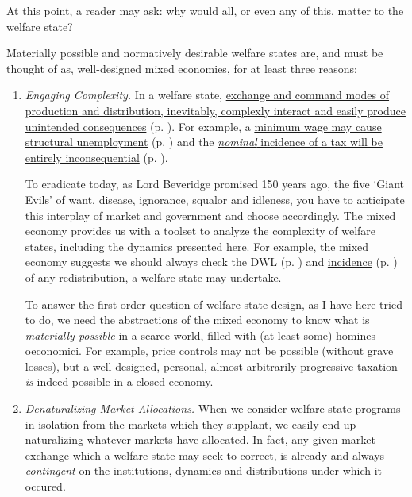 At this point, a reader may ask: why would all, or even any of this, matter to the welfare state?

Materially possible and normatively desirable welfare states are, and must be thought of as, well-designed mixed economies, for at least three reasons:

\begin{enumerate}
	\item \emph{Engaging Complexity.} In a welfare state, \hyperref[sec:interface]{exchange and command modes of production and distribution, inevitably, complexly interact and easily produce unintended consequences} (p. \pageref{sec:interface}). For example, a \hyperref[sec:prince_controls]{minimum wage may cause structural unemployment} (p. \pageref{sec:price_controls}) and the \hyperref[sec:well-determined_incidence]{\emph{nominal} incidence of a tax will be entirely inconsequential} (p. \pageref{sec:well-determined_incidence}). 
	
	To eradicate today, as Lord Beveridge promised 150 years ago, the five `Giant Evils' of want, disease, ignorance, squalor and idleness, you have to anticipate this interplay of market and government and choose accordingly. The mixed economy provides us with a toolset to analyze the complexity of welfare states, including the dynamics presented here. For example, the mixed economy suggests we should always check the \gls{DWL} (p. \pageref{sec:minimal_DWL}) and \hyperref[sec:well-determined_incidence]{incidence} (p. \pageref{sec:well-determined_incidence}) of any redistribution, a welfare state may undertake.
	
	To answer the first-order question of welfare state design, as I have here tried to do, we need the abstractions of the mixed economy to know what is \emph{materially possible} in a scarce world, filled with (at least some) homines oeconomici. For example, price controls may not be possible (without grave losses), but a well-designed, personal, almost arbitrarily progressive taxation \emph{is} indeed possible in a closed economy.	
	
	\item \emph{Denaturalizing Market Allocations.} When we consider welfare state programs in isolation from the markets which they supplant, we easily end up naturalizing whatever markets have allocated. In fact, any given market exchange which a welfare state may seek to correct, is already and always \emph{contingent} on the institutions, dynamics and distributions under which it occured. 
	

\end{enumerate}

